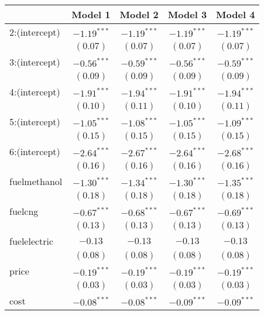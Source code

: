 
\begin{table}
\tiny
\begin{center}
\begin{tabular}{l c c c c }
\hline
 & Model 1 & Model 2 & Model 3 & Model 4 \\
\hline
2:(intercept)    & $-1.19^{***}$ & $-1.19^{***}$ & $-1.19^{***}$ & $-1.19^{***}$ \\
                 & $(0.07)$      & $(0.07)$      & $(0.07)$      & $(0.07)$      \\
3:(intercept)    & $-0.56^{***}$ & $-0.59^{***}$ & $-0.56^{***}$ & $-0.59^{***}$ \\
                 & $(0.09)$      & $(0.09)$      & $(0.09)$      & $(0.09)$      \\
4:(intercept)    & $-1.91^{***}$ & $-1.94^{***}$ & $-1.91^{***}$ & $-1.94^{***}$ \\
                 & $(0.10)$      & $(0.11)$      & $(0.10)$      & $(0.11)$      \\
5:(intercept)    & $-1.05^{***}$ & $-1.08^{***}$ & $-1.05^{***}$ & $-1.09^{***}$ \\
                 & $(0.15)$      & $(0.15)$      & $(0.15)$      & $(0.15)$      \\
6:(intercept)    & $-2.64^{***}$ & $-2.67^{***}$ & $-2.64^{***}$ & $-2.68^{***}$ \\
                 & $(0.16)$      & $(0.16)$      & $(0.16)$      & $(0.16)$      \\
fuelmethanol     & $-1.30^{***}$ & $-1.34^{***}$ & $-1.30^{***}$ & $-1.35^{***}$ \\
                 & $(0.18)$      & $(0.18)$      & $(0.18)$      & $(0.18)$      \\
fuelcng          & $-0.67^{***}$ & $-0.68^{***}$ & $-0.67^{***}$ & $-0.69^{***}$ \\
                 & $(0.13)$      & $(0.13)$      & $(0.13)$      & $(0.13)$      \\
fuelelectric     & $-0.13$       & $-0.13$       & $-0.13$       & $-0.13$       \\
                 & $(0.08)$      & $(0.08)$      & $(0.08)$      & $(0.08)$      \\
price            & $-0.19^{***}$ & $-0.19^{***}$ & $-0.19^{***}$ & $-0.19^{***}$ \\
                 & $(0.03)$      & $(0.03)$      & $(0.03)$      & $(0.03)$      \\
cost             & $-0.08^{***}$ & $-0.08^{***}$ & $-0.09^{***}$ & $-0.09^{***}$ \\

\end{tabular}
\end{center}
\end{table}
